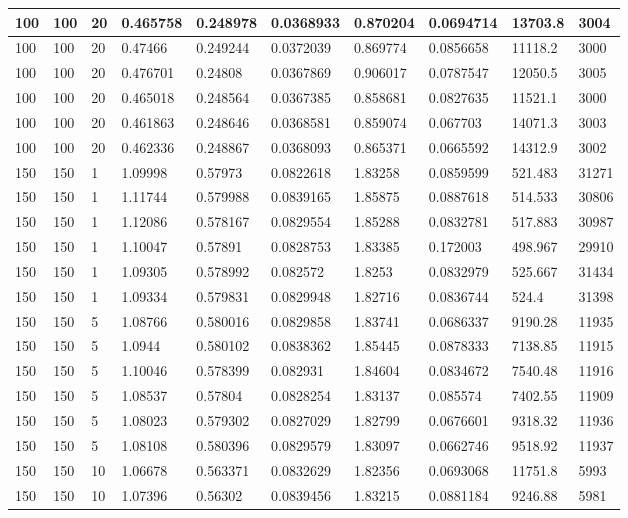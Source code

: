 \begin{landscape}
\begin{longtable}{ | l | l | l | l | l | l | l | l | l | l | }
100 & 100 & 20 & 0.465758 & 0.248978 & 0.0368933 & 0.870204 & 0.0694714 & 13703.8 & 3004\\ \hline
100 & 100 & 20 & 0.47466 & 0.249244 & 0.0372039 & 0.869774 & 0.0856658 & 11118.2 & 3000\\ \hline
100 & 100 & 20 & 0.476701 & 0.24808 & 0.0367869 & 0.906017 & 0.0787547 & 12050.5 & 3005\\ \hline
100 & 100 & 20 & 0.465018 & 0.248564 & 0.0367385 & 0.858681 & 0.0827635 & 11521.1 & 3000\\ \hline
100 & 100 & 20 & 0.461863 & 0.248646 & 0.0368581 & 0.859074 & 0.067703 & 14071.3 & 3003\\ \hline
100 & 100 & 20 & 0.462336 & 0.248867 & 0.0368093 & 0.865371 & 0.0665592 & 14312.9 & 3002\\ \hline
150 & 150 & 1 & 1.09998 & 0.57973 & 0.0822618 & 1.83258 & 0.0859599 & 521.483 & 31271\\ \hline
150 & 150 & 1 & 1.11744 & 0.579988 & 0.0839165 & 1.85875 & 0.0887618 & 514.533 & 30806\\ \hline
150 & 150 & 1 & 1.12086 & 0.578167 & 0.0829554 & 1.85288 & 0.0832781 & 517.883 & 30987\\ \hline
150 & 150 & 1 & 1.10047 & 0.57891 & 0.0828753 & 1.83385 & 0.172003 & 498.967 & 29910\\ \hline
150 & 150 & 1 & 1.09305 & 0.578992 & 0.082572 & 1.8253 & 0.0832979 & 525.667 & 31434\\ \hline
150 & 150 & 1 & 1.09334 & 0.579831 & 0.0829948 & 1.82716 & 0.0836744 & 524.4 & 31398\\ \hline
150 & 150 & 5 & 1.08766 & 0.580016 & 0.0829858 & 1.83741 & 0.0686337 & 9190.28 & 11935\\ \hline
150 & 150 & 5 & 1.0944 & 0.580102 & 0.0838362 & 1.85445 & 0.0878333 & 7138.85 & 11915\\ \hline
150 & 150 & 5 & 1.10046 & 0.578399 & 0.082931 & 1.84604 & 0.0834672 & 7540.48 & 11916\\ \hline
150 & 150 & 5 & 1.08537 & 0.57804 & 0.0828254 & 1.83137 & 0.085574 & 7402.55 & 11909\\ \hline
150 & 150 & 5 & 1.08023 & 0.579302 & 0.0827029 & 1.82799 & 0.0676601 & 9318.32 & 11936\\ \hline
150 & 150 & 5 & 1.08108 & 0.580396 & 0.0829579 & 1.83097 & 0.0662746 & 9518.92 & 11937\\ \hline
150 & 150 & 10 & 1.06678 & 0.563371 & 0.0832629 & 1.82356 & 0.0693068 & 11751.8 & 5993\\ \hline
150 & 150 & 10 & 1.07396 & 0.56302 & 0.0839456 & 1.83215 & 0.0881184 & 9246.88 & 5981\\ \hline

\end{longtable}
\end{landscape}
